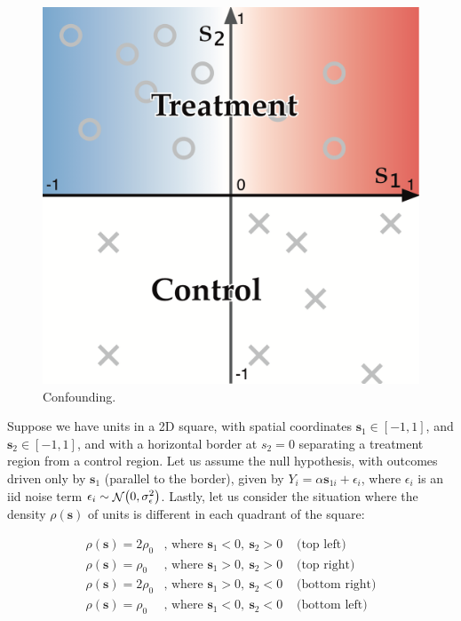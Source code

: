\documentclass[letter]{article}
\makeatletter
\def\maxwidth{\ifdim\Gin@nat@width>\linewidth\linewidth
\else\Gin@nat@width\fi}
\let\Oldincludegraphics\includegraphics
\renewcommand{\includegraphics}[1]{\Oldincludegraphics[width=0.9\maxwidth]{#1}}
\DeclarePairedDelimiter{\parenthesis}{\lparen}{\rparen}
\newcommand{\del}[1]{\parenthesis*{#1}}
\DeclareMathOperator{\normal}{\mathcal{N}}
\newcommand{\sigman}{\sigma_{\epsilon}}
\newcommand{\svec}{\mathbold{s}}
\makeatother
\begin{document}
    	\begin{figure}
\centering
\includegraphics{figures/confounding/confounding.png}
\caption{Confounding. \label{fig:confounding}}
\end{figure}
    


    	Suppose we have units in a 2D square, with spatial coordinates \(\svec_1 \in [-1,1]\), and \(\svec_2 \in [-1,1]\), and with a horizontal border at \(s_2=0\) separating a treatment region from a control region.
Let us assume the null hypothesis, with outcomes driven only by \(\svec_1\) (parallel to the border), given by \(Y_{i} = \alpha \svec_{1i} + \epsilon_i\),
where \(\epsilon_i\) is an iid noise term \(\epsilon_i \sim \normal\del{0, \sigman^2}\).
Lastly, let us consider the situation where the density \(\rho(\svec)\) of units is different in each quadrant of the square:

\begin{equation}
\begin{aligned}
    \rho(\svec) = 2\rho_0 & \text{, where }\svec_1 < 0,~\svec_2 > 0 & \text{ (top left)} \\
    \rho(\svec) = \rho_0 & \text{, where }\svec_1 > 0,~\svec_2 > 0 & \text{ (top right)} \\
    \rho(\svec) = 2\rho_0 & \text{, where }\svec_1 > 0,~\svec_2 < 0 & \text{ (bottom right)}  \\
    \rho(\svec) = \rho_0 & \text{, where }\svec_1 < 0,~\svec_2 < 0 & \text{ (bottom left)}
\end{aligned}
\end{equation}
\end{document}
